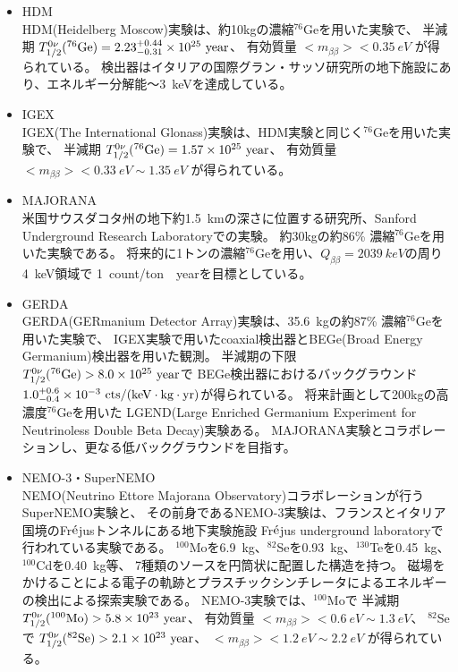 \documentclass[a4paper,10pt]{jreport}
\begin{document}
\begin{itemize}

	\item HDM \\
	HDM(Heidelberg Moscow)実験は、約10kgの濃縮$^{76}$Geを用いた実験で、
	半減期 $T_{1/2}^{0\nu}(^{76}\rm{Ge}) = 2.23 ^{+0.44} _{-0.31} \times 10^{25} \ \rm{year}$、
	有効質量 $< m_{\beta\beta} > < \SI{0.35}{eV}$
	が得られている。
	検出器はイタリアの国際グラン・サッソ研究所の地下施設にあり、エネルギー分解能〜\SI{3}{keV}を達成している\cite{HDM}。
	
	\item IGEX \\
	IGEX(The International Glonass)実験は、HDM実験と同じく$^{76}$Geを用いた実験で、
	半減期 $T_{1/2}^{0\nu}(^{76}\rm{Ge}) = 1.57 \times 10^{25} \ \rm{year}$、
	有効質量 $< m_{\beta\beta} > < \SI{0.33}{eV} \sim \SI{1.35}{eV}$
	が得られている。
	
	\item MAJORANA \\
	米国サウスダコタ州の地下約\SI{1.5}{km}の深さに位置する研究所、Sanford Underground Research Laboratoryでの実験。
	約30kgの約86\% 濃縮$^{76}$Geを用いた実験である。
	将来的に1トンの濃縮$^{76}$Geを用い、$Q_{\beta\beta}=\SI{2039}{keV}$の周り\SI{4}{keV}領域で
	\SI{1}{count/ton \cdot year}を目標としている\cite{MAJORANA}。
	
	\item GERDA \\
	GERDA(GERmanium Detector Array)実験は、\SI{35.6}{kg}の約87\% 濃縮$^{76}$Geを用いた実験で、
	IGEX実験で用いたcoaxial検出器とBEGe(Broad Energy Germanium)検出器を用いた観測。
	半減期の下限 $T_{1/2}^{0\nu}(^{76}\rm{Ge}) > 8.0 \times 10^{25} \ \rm{year}$で
	BEGe検出器におけるバックグラウンド$1.0 ^{+0.6} _{-0.4} \times 10^{-3} \ \rm{cts/(keV \cdot kg \cdot yr)}$が得られている。
	将来計画として200kgの高濃度$^{76}$Geを用いた
	LGEND(Large Enriched Germanium Experiment for Neutrinoless Double Beta Decay)実験ある。
	MAJORANA実験とコラボレーションし、更なる低バックグラウンドを目指す\cite{GERDA}。
	
	\item NEMO-3・SuperNEMO \\
	NEMO(Neutrino Ettore Majorana Observatory)コラボレーションが行うSuperNEMO実験と、
	その前身であるNEMO-3実験は、フランスとイタリア国境のFr$\acute{\rm{e}}$jusトンネルにある地下実験施設
	Fr$\acute{\rm{e}}$jus underground laboratoryで行われている実験である。
	$^{100}$Moを\SI{6.9}{kg}、$^{82}$Seを\SI{0.93}{kg}、$^{130}$Teを\SI{0.45}{kg}、$^{100}$Cdを\SI{0.40}{kg}等、
	7種類のソースを円筒状に配置した構造を持つ。
	磁場をかけることによる電子の軌跡とプラスチックシンチレータによるエネルギーの検出による探索実験である。
	NEMO-3実験では、$^{100}$Moで
	半減期 $T_{1/2}^{0\nu}(^{100}\rm{Mo}) > 5.8 \times 10^{23} \ \rm{year}$、
	有効質量 $< m_{\beta\beta} > < \SI{0.6}{eV} \sim \SI{1.3}{eV}$、
	$^{82}$Seで
	$T_{1/2}^{0\nu}(^{82}\rm{Se}) > 2.1 \times 10^{23} \ \rm{year}$、
	$< m_{\beta\beta} > < \SI{1.2}{eV} \sim \SI{2.2}{eV}$
	が得られている\cite{NEMO}。
	

\end{itemize}
\end{document}
